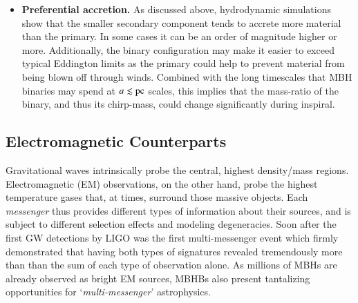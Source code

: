 \documentclass[onecolumn,authoryear]{els-mrw}
\begin{document}
\begin{itemize}
    \item \textbf{Preferential accretion.}  As discussed above, hydrodynamic simulations show that the smaller secondary component tends to accrete more material than the primary.  In some cases it can be an order of magnitude higher or more.  Additionally, the binary configuration may make it easier to exceed typical Eddington limits as the primary could help to prevent material from being blown off through winds.  Combined with the long timescales that MBH binaries may spend at $a \lesssim \mathrm{pc}$ scales, this implies that the mass-ratio of the binary, and thus its chirp-mass, could change significantly during inspiral.
\end{itemize}

\subsection{Electromagnetic Counterparts}\label{sec:ems}


Gravitational waves intrinsically probe the central, highest density/mass regions.  Electromagnetic (EM) observations, on the other hand, probe the highest temperature gases that, at times, surround those massive objects.  Each \textit{messenger} thus provides different types of information about their sources, and is subject to different selection effects and modeling degeneracies.  Soon after the first GW detections by LIGO was the first multi-messenger event which firmly demonstrated that having both types of signatures revealed tremendously more than than the sum of each type of observation alone.  As millions of MBHs are already observed as bright EM sources, MBHBs also present tantalizing opportunities for `\textit{multi-messenger}' astrophysics.
\end{document}
